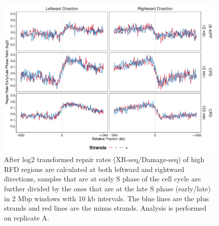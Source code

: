 \begin{figure}[H]
    \begin{center}
    \includegraphics[width=\textwidth]{Chapters/7_appendix/figures/supfig72}
    \caption[Repair rate early/late ratio of high RFDs in 2 Mbp (replicate A).]{After log2 transformed repair rates (XR-seq/Damage-seq) of high RFD regions are calculated at both leftward and rightward directions, samples that are at early S phase of the cell cycle are further divided by the ones that are at the late S phase (early/late) in 2 Mbp windows with 10 kb intervals. The blue lines are the plus strands and red lines are the minus strands. Analysis is performed on replicate A.}
    \label{supfig:rrel2000rfdA}
    \end{center}
    \end{figure}

